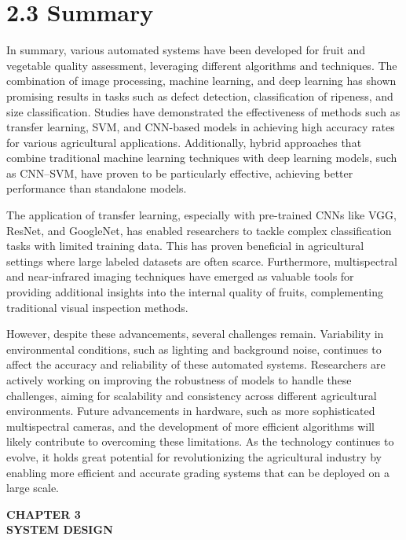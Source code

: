 \documentclass[12pt,a4paper]{report}
\begin{document}
	\section*{2.3 Summary}
\hspace{1cm}In summary, various automated systems have been developed for fruit and vegetable quality assessment, leveraging different algorithms and techniques. The combination of image processing, machine learning, and deep learning has shown promising results in tasks such as defect detection, classification of ripeness, and size classification. Studies have demonstrated the effectiveness of methods such as transfer learning, SVM, and CNN-based models in achieving high accuracy rates for various agricultural applications. Additionally, hybrid approaches that combine traditional machine learning techniques with deep learning models, such as CNN–SVM, have proven to be particularly effective, achieving better performance than standalone models.

The application of transfer learning, especially with pre-trained CNNs like VGG, ResNet, and GoogleNet, has enabled researchers to tackle complex classification tasks with limited training data. This has proven beneficial in agricultural settings where large labeled datasets are often scarce. Furthermore, multispectral and near-infrared imaging techniques have emerged as valuable tools for providing additional insights into the internal quality of fruits, complementing traditional visual inspection methods.

However, despite these advancements, several challenges remain. Variability in environmental conditions, such as lighting and background noise, continues to affect the accuracy and reliability of these automated systems. Researchers are actively working on improving the robustness of models to handle these challenges, aiming for scalability and consistency across different agricultural environments. Future advancements in hardware, such as more sophisticated multispectral cameras, and the development of more efficient algorithms will likely contribute to overcoming these limitations. As the technology continues to evolve, it holds great potential for revolutionizing the agricultural industry by enabling more efficient and accurate grading systems that can be deployed on a large scale.

	
		\newpage
	
	\begin{center}
		\textbf{\Large CHAPTER 3}\\[0.5cm]
		\textbf{\Large SYSTEM DESIGN}
	\end{center}
\end{document}
